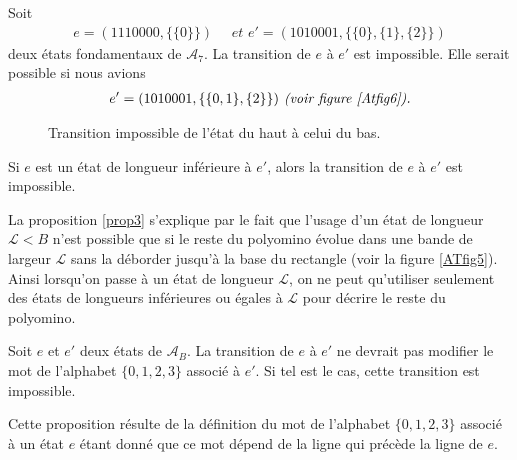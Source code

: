 \begin{Ex}\label{ex6}
Soit 
\begin{eqnarray*}
e=(1110000,\{\{0\}\}) \quad \textit{ et   } e'=(1010001,\{\{0\},\{1\},\{2\}\})  
\end{eqnarray*}
deux états  fondamentaux de $\mathcal{A}_{7}$. La transition de $e$ à $e'$ est impossible. Elle serait possible si nous avions
\begin{eqnarray*}
 e'=(1010001,\{\{0,1\},\{2\}\}) \textit{ (voir figure \ref{Atfig6}).}
\end{eqnarray*}
\begin{figure}[!htb]
\begin{minipage}[c]{.26\linewidth}
        \centering
\end{minipage}
\hfill
\begin{minipage}[c]{.6\linewidth}
        \centering
\begin{logicpuzzle}[rows=2,columns=7,color=cyan!100, width=750px,scale=0.5]
\framepuzzle[black!50]
\end{logicpuzzle}
\end{minipage}
\caption{\label{Atfig6} Transition impossible de l'état du haut à celui du bas.}
\end{figure} 
\end{Ex}
\begin{Prop}\label{prop3}
Si $e$ est un état de longueur inférieure  à $e'$, alors la transition de $e$ à $e'$ est impossible.
\end{Prop}
\begin{Pre}
La proposition \ref{prop3} s'explique par le fait que  l'usage d'un état de longueur $\mathcal{L}<B$ n'est possible que si le reste du polyomino évolue dans une bande de largeur $\mathcal{L}$  sans la déborder jusqu'à la base du rectangle (voir la figure \ref{ATfig5}). Ainsi lorsqu'on passe à un état de longueur $\mathcal{L}$, on ne peut qu'utiliser seulement des états de longueurs inférieures ou égales à $\mathcal{L}$ pour décrire le reste du polyomino.
\end{Pre}
\begin{Prop}\label{propdec191}
Soit $e$ et $e'$ deux états de $\mathcal{A}_{B}$. La transition de $e$ à $e'$ ne devrait pas  modifier le mot de l'alphabet $\{0,1,2,3\}$ associé à $e'$. Si tel est le cas, cette transition  est impossible.
\end{Prop}
\begin{Pre}
Cette proposition résulte de la définition du mot de l'alphabet $\{0,1,2,3\}$ associé à un état $e$ étant donné que ce mot dépend de la ligne qui précède la ligne de  $e$.
\end{Pre}
